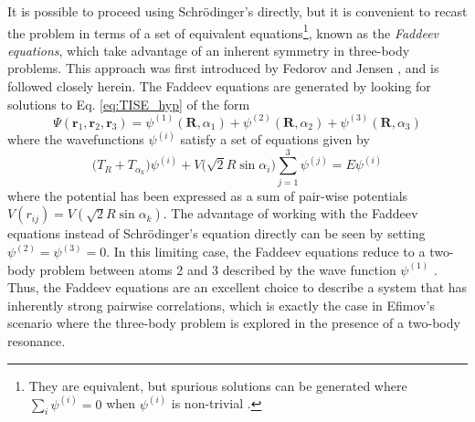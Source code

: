 \documentclass[prl,onecolumn,amsmath,amssymb,titlepage,nofootinbib,preprint]{revtex4-1}
\begin{document}
It is possible to proceed using Schr\"{o}dinger's directly, but it is convenient to recast the problem in terms of a set of equivalent equations\footnote{They are equivalent, but spurious solutions can be generated where $\sum_{i}\psi^{(i)}=0$ when $\psi^{(i)}$ is non-trivial \cite{Braaten_2006}.}, known as the \textit{Faddeev equations}\cite{Faddeev1961}, which take advantage of an inherent symmetry in three-body problems.  This approach was first introduced by Fedorov and Jensen \cite{Fedorov1993}, and is followed closely herein.  The Faddeev equations are generated by looking for solutions to Eq. \ref{eq:TISE_hyp} of the form 
	\begin{equation}\label{eq:Faddeev_psi}
		\Psi(\mathbf{r}_{1},\mathbf{r}_{2},\mathbf{r}_{3})=\psi^{(1)}(\mathbf{R},\alpha_{1})+
		\psi^{(2)}(\mathbf{R},\alpha_{2})+\psi^{(3)}(\mathbf{R},\alpha_{3})
	\end{equation}
where the wavefunctions $\psi^{(i)}$ satisfy a set of equations given by
	\begin{equation}\label{eq:Faddeev_eqs}
		\big(T_{R}+T_{\alpha_{k}}\big)\psi^{(i)}+V\big(\sqrt{2}R\sin\alpha_{i}\big)\sum_{j=1}^{3}\psi^{(j)} = E\psi^{(i)}
	\end{equation}
where the potential has been expressed as a sum of pair-wise potentials $V(r_{ij})=V(\sqrt{2}R\sin\alpha_{k})$. The advantage of working with the Faddeev equations instead of Schr\"{o}dinger's equation directly can be seen by setting $\psi^{(2)}=\psi^{(3)}=0$.  In this limiting case, the Faddeev equations reduce to a two-body problem between atoms 2 and 3 described by the wave function $\psi^{(1)}$ \cite{Braaten_2006}.  Thus, the Faddeev equations are an excellent choice to describe a system that has inherently strong pairwise correlations, which is exactly the case in Efimov's scenario where the three-body problem is explored in the presence of a two-body resonance.
\end{document}
